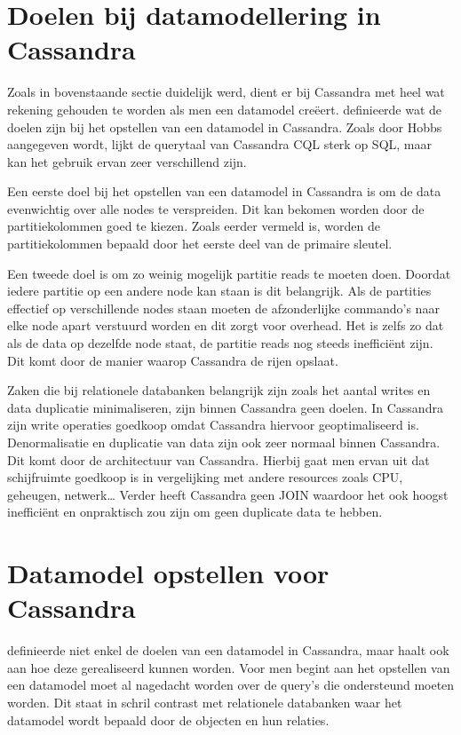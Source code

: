 \section{Doelen bij datamodellering in Cassandra}
Zoals in bovenstaande sectie duidelijk werd, dient er bij Cassandra met heel wat rekening gehouden te worden als men een datamodel creëert.
\cite{Hobbs2015Datamodelling} definieerde wat de doelen zijn bij het opstellen van een datamodel in Cassandra.
Zoals door Hobbs aangegeven wordt, lijkt de querytaal van Cassandra CQL sterk op SQL, maar kan het gebruik ervan zeer verschillend zijn.

Een eerste doel bij het opstellen van een datamodel in Cassandra is om de data evenwichtig over alle nodes te verspreiden.
Dit kan bekomen worden door de partitiekolommen goed te kiezen.
Zoals eerder vermeld is, worden de partitiekolommen bepaald door het eerste deel van de primaire sleutel.

Een tweede doel is om zo weinig mogelijk partitie reads te moeten doen.
Doordat iedere partitie op een andere node kan staan is dit belangrijk.
Als de partities effectief op verschillende nodes staan moeten de afzonderlijke commando's naar elke node apart verstuurd worden en dit zorgt voor overhead.
Het is zelfs zo dat als de data op dezelfde node staat, de partitie reads nog steeds inefficiënt zijn.
Dit komt door de manier waarop Cassandra de rijen opslaat.

Zaken die bij relationele databanken belangrijk zijn zoals het aantal writes en data duplicatie minimaliseren, zijn binnen Cassandra geen doelen.
In Cassandra zijn write operaties goedkoop omdat Cassandra hiervoor geoptimaliseerd is.
Denormalisatie en duplicatie van data zijn ook zeer normaal binnen Cassandra.
Dit komt door de architectuur van Cassandra.
Hierbij gaat men ervan uit dat schijfruimte goedkoop is in vergelijking met andere resources zoals CPU, geheugen, netwerk\dots
Verder heeft Cassandra geen JOIN waardoor het ook hoogst inefficiënt en onpraktisch zou zijn om geen duplicate data te hebben.

\section{Datamodel opstellen voor Cassandra}
\cite{Hobbs2015Datamodelling} definieerde niet enkel de doelen van een datamodel in Cassandra, maar haalt ook aan hoe deze gerealiseerd kunnen worden.
Voor men begint aan het opstellen van een datamodel moet al nagedacht worden over de query's die ondersteund moeten worden.
Dit staat in schril contrast met relationele databanken waar het datamodel wordt bepaald door de objecten en hun relaties.

